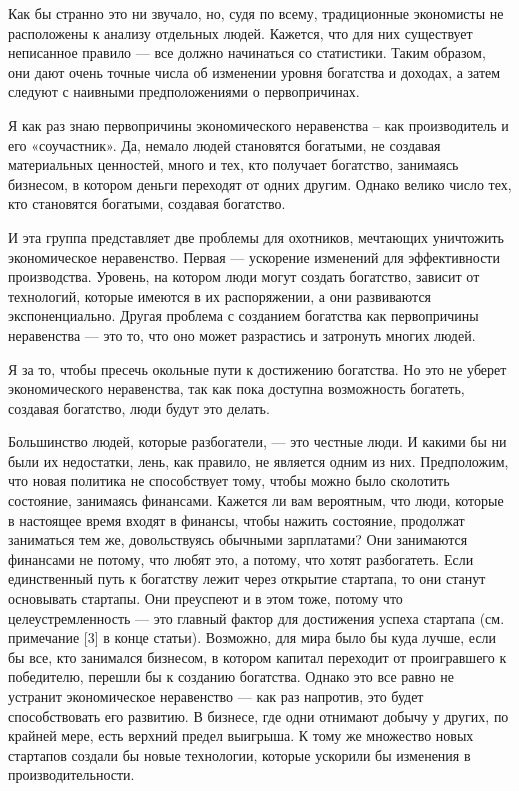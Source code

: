 \documentclass[ebook,12pt,oneside,openany]{memoir}
\begin{document}
Как бы странно это ни звучало, но, судя по всему, традиционные
экономисты не расположены к анализу отдельных людей. Кажется, что для
них существует неписанное правило — все должно начинаться со
статистики. Таким образом, они дают очень точные числа об изменении
уровня богатства и доходах, а затем следуют с наивными предположениями
о первопричинах.

Я как раз знаю первопричины экономического неравенства – как
производитель и его «соучастник». Да, немало людей становятся
богатыми, не создавая материальных ценностей, много и тех, кто
получает богатство, занимаясь бизнесом, в котором деньги переходят от
одних другим. Однако велико число тех, кто становятся богатыми,
создавая богатство.

И эта группа представляет две проблемы для охотников, мечтающих
уничтожить экономическое неравенство. Первая — ускорение изменений для
эффективности производства. Уровень, на котором люди могут создать
богатство, зависит от технологий, которые имеются в их распоряжении, а
они развиваются экспоненциально. Другая проблема с созданием богатства
как первопричины неравенства — это то, что оно может разрастись и
затронуть многих людей.

Я за то, чтобы пресечь окольные пути к достижению богатства. Но это не
уберет экономического неравенства, так как пока доступна возможность
богатеть, создавая богатство, люди будут это делать.

Большинство людей, которые разбогатели, — это честные люди. И какими
бы ни были их недостатки, лень, как правило, не является одним из них.
Предположим, что новая политика не способствует тому, чтобы можно было
сколотить состояние, занимаясь финансами. Кажется ли вам вероятным,
что люди, которые в настоящее время входят в финансы, чтобы нажить
состояние, продолжат заниматься тем же, довольствуясь обычными
зарплатами? Они занимаются финансами не потому, что любят это, а
потому, что хотят разбогатеть. Если единственный путь к богатству
лежит через открытие стартапа, то они станут основывать стартапы. Они
преуспеют и в этом тоже, потому что целеустремленность — это главный
фактор для достижения успеха стартапа (см. примечание [3] в конце
статьи). Возможно, для мира было бы куда лучше, если бы все, кто
занимался бизнесом, в котором капитал переходит от проигравшего к
победителю, перешли бы к созданию богатства. Однако это все равно не
устранит экономическое неравенство — как раз напротив, это будет
способствовать его развитию. В бизнесе, где одни отнимают добычу у
других, по крайней мере, есть верхний предел выигрыша. К тому же
множество новых стартапов создали бы новые технологии, которые
ускорили бы изменения в производительности.
\end{document}

